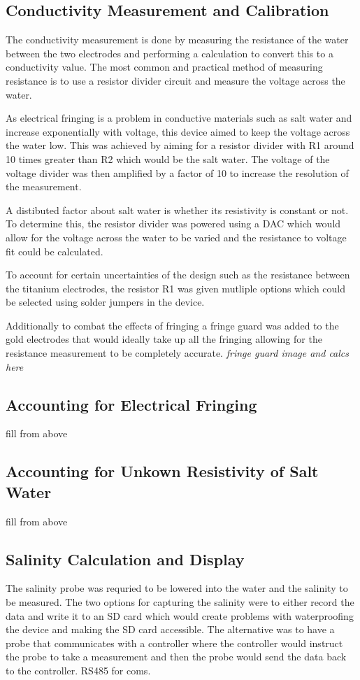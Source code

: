 \subsection{Conductivity Measurement and Calibration}

The conductivity measurement is done by measuring the resistance of the water between the two electrodes and performing a calculation to convert this to a conductivity value.
The most common and practical method of measuring resistance is to use a resistor divider circuit and measure the voltage across the water.

As electrical fringing is a problem in conductive materials such as salt water and increase exponentially with voltage, this device aimed to keep the voltage across the water low.
This was achieved by aiming for a resistor divider with R1 around 10 times greater than R2 which would be the salt water.
The voltage of the voltage divider was then amplified by a factor of 10 to increase the resolution of the measurement.

A distibuted factor about salt water is whether its resistivity is constant or not.
To determine this, the resistor divider was powered using a DAC which would allow for the voltage across the water to be varied and the resistance to voltage fit could be calculated.

To account for certain uncertainties of the design such as the resistance between the titanium electrodes, the resistor R1 was given mutliple options which could be selected using solder jumpers in the device.

Additionally to combat the effects of fringing a fringe guard was added to the gold electrodes that would ideally take up all the fringing allowing for the resistance measurement to be completely accurate.
\textit{fringe guard image and calcs here}

\subsection{Accounting for Electrical Fringing}
fill from above

\subsection{Accounting for Unkown Resistivity of Salt Water}
fill from above

\subsection{Salinity Calculation and Display}
The salinity probe was requried to be lowered into the water and the salinity to be measured.
The two options for capturing the salinity were to either record the data and write it to an SD card which would create problems with waterproofing the device and making the SD card accessible.
The alternative was to have a probe that communicates with a controller where the controller would instruct the probe to take a measurement and then the probe would send the data back to the controller.
RS485 for coms.

